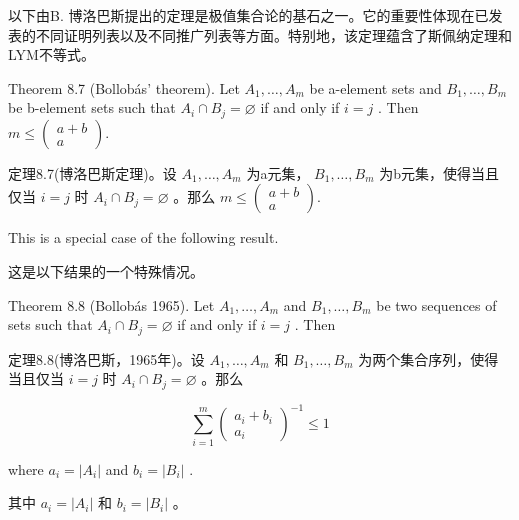 \documentclass[10pt]{article}
\begin{document}
\begin{tcolorbox}\relax
以下由B. 博洛巴斯提出的定理是极值集合论的基石之一。它的重要性体现在已发表的不同证明列表以及不同推广列表等方面。特别地，该定理蕴含了斯佩纳定理和LYM不等式。
\end{tcolorbox}

Theorem 8.7 (Bollobás' theorem). Let \({A}_{1},\ldots ,{A}_{m}\) be a-element sets and \({B}_{1},\ldots ,{B}_{m}\) be b-element sets such that \({A}_{i} \cap  {B}_{j} = \varnothing\) if and only if \(i = j\) . Then \(m \leq  \left( \begin{matrix} a + b \\  a \end{matrix}\right) .\)

\begin{tcolorbox}\relax
定理8.7(博洛巴斯定理)。设 \({A}_{1},\ldots ,{A}_{m}\) 为a元集， \({B}_{1},\ldots ,{B}_{m}\) 为b元集，使得当且仅当 \(i = j\) 时 \({A}_{i} \cap  {B}_{j} = \varnothing\) 。那么 \(m \leq  \left( \begin{matrix} a + b \\  a \end{matrix}\right) .\)
\end{tcolorbox}

This is a special case of the following result.

\begin{tcolorbox}\relax
这是以下结果的一个特殊情况。
\end{tcolorbox}

Theorem 8.8 (Bollobás 1965). Let \({A}_{1},\ldots ,{A}_{m}\) and \({B}_{1},\ldots ,{B}_{m}\) be two sequences of sets such that \({A}_{i} \cap  {B}_{j} = \varnothing\) if and only if \(i = j\) . Then

\begin{tcolorbox}\relax
定理8.8(博洛巴斯，1965年)。设 \({A}_{1},\ldots ,{A}_{m}\) 和 \({B}_{1},\ldots ,{B}_{m}\) 为两个集合序列，使得当且仅当 \(i = j\) 时 \({A}_{i} \cap  {B}_{j} = \varnothing\) 。那么
\end{tcolorbox}

\[
\mathop{\sum }\limits_{{i = 1}}^{m}{\left( \begin{matrix} {a}_{i} + {b}_{i} \\  {a}_{i} \end{matrix}\right) }^{-1} \leq  1 \tag{8.2}
\]

where \({a}_{i} = \left| {A}_{i}\right|\) and \({b}_{i} = \left| {B}_{i}\right|\) .

\begin{tcolorbox}\relax
其中 \({a}_{i} = \left| {A}_{i}\right|\) 和 \({b}_{i} = \left| {B}_{i}\right|\) 。
\end{tcolorbox}
\end{document}
